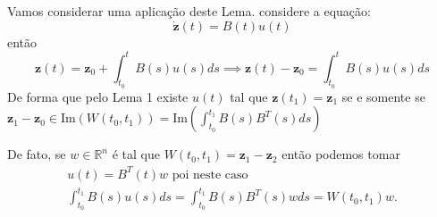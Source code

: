 \documentclass{beamer}
\begin{document}
\begin{frame}
  Vamos considerar uma aplicação deste Lema.
  considere a equação:
  $$ \dot{\mathbf{z}}(t) = B(t)u(t)$$
  então 
  $$ \mathbf{z}(t) = \mathbf{z}_0 + \int_{t_0}^t B(s)u(s)ds \implies \mathbf{z}(t)-\mathbf{z}_0 = \int_{t_0}^t B(s)u(s)ds$$
De forma que pelo Lema 1 existe $u(t)$ tal que $\mathbf{z}(t_1)=\mathbf{z}_1$ se e somente se 
$\mathbf{z}_1 - \mathbf{z}_0 \in \text{Im}(W(t_0,t_1)) = \text{Im}(\int_{t_0}^{t_1}B(s)B^T(s)ds)$
\end{frame}

\begin{frame}
  De fato, se $w\in \mathbb{R}^n $ é tal que $W(t_0,t_1)=\mathbf{z}_1 -\mathbf{z}_2$
  então podemos tomar 
  \begin{gather*}
    u(t) = B^T(t)w \text{ poi neste caso }\\
    \int_{t_0}^{t_1}B(s)u(s)ds = \int_{t_0}^{t_1}B(s)B^T(s)wds = W(t_0,t_1)w.
  \end{gather*}
\end{frame}
\end{document}

